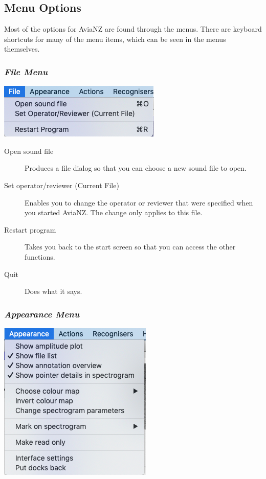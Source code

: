 \documentclass{article}
\begin{document}
\subsection{Menu Options}	

Most of the options for AviaNZ are found through the menus. There are keyboard shortcuts for many of the menu items, which can be seen in the menus themselves. 

\subsubsection{{\em File Menu}}

\begin{center}
\includegraphics[width=.3\textwidth]{Figs/filemenu}
\end{center}

\begin{description}
\item[Open sound file] Produces a file dialog so that you can choose a new sound file to open.
\item[Set operator/reviewer (Current File)] Enables you to change the operator or reviewer that were specified when you started AviaNZ. The change only applies to this file. 
\item[Restart program] Takes you back to the start screen so that you can access the other functions.
\item[Quit] Does what it says.
\end{description}

\subsubsection{{\em Appearance Menu}}

\begin{center}
\includegraphics[width=.3\textwidth]{Figs/appearancemenu}
\end{center}
\end{document}
